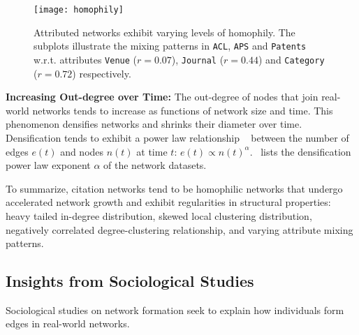 
\begin{figure}
 \centering
 \texttt{[image: homophily]}
 \caption{
    Attributed networks exhibit varying levels of homophily. The subplots
    illustrate the mixing patterns in \texttt{ACL}, \texttt{APS} and \texttt{Patents}
    w.r.t. attributes \texttt{Venue} ($r=0.07$), \texttt{Journal} ($r=0.44$) and
    \texttt{Category} ($r=0.72$) respectively.
 }
 \label{fig:mixing}
 \vspace{-15pt}
\end{figure}

\textbf{Increasing Out-degree over Time:}
The out-degree of nodes that join real-world networks tends to increase
as functions of network size and time. This phenomenon densifies networks and shrinks their
diameter over time. Densification tends to exhibit a power law relationship
~\cite{leskovec2005graphs} between the number of edges $e(t)$ and nodes $n(t)$ at time $t$: $e(t) \propto n(t)^{\alpha}$.~ lists the densification power law exponent $\alpha$ of the network datasets.

To summarize, citation networks tend to be homophilic networks that undergo
accelerated network growth and exhibit regularities in structural properties:
heavy tailed in-degree distribution, skewed local clustering distribution,
negatively correlated degree-clustering relationship, and varying attribute
mixing patterns.



\subsection{Insights from Sociological Studies}

Sociological studies on network formation seek to explain
how individuals form edges in real-world networks.

